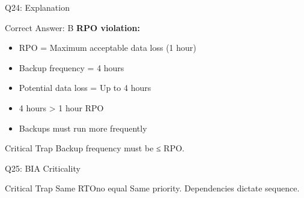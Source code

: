 \documentclass{beamer}
\begin{document}
				\begin{frame}{Q24: Explanation}
					\begin{block}{Correct Answer: B}
						\textbf{RPO violation:}
						\begin{itemize}
							\item RPO = Maximum acceptable data loss (1 hour)
							\item Backup frequency = 4 hours
							\item Potential data loss = Up to 4 hours
							\item 4 hours > 1 hour RPO
							\item Backups must run more frequently
						\end{itemize}
					\end{block}
					\begin{alertblock}{Critical Trap}
						Backup frequency must be ≤ RPO.
					\end{alertblock}
				\end{frame}
				
				\begin{frame}{Q25: BIA Criticality}
						\begin{alertblock}{Critical Trap}
							Same RTOno equal Same priority. Dependencies dictate sequence.
						\end{alertblock}
					\end{frame}
					
\end{document}
